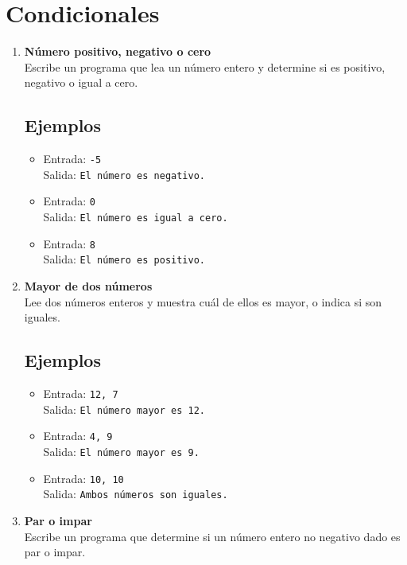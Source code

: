 \section{Condicionales}
\begin{enumerate}
    \item \textbf{Número positivo, negativo o cero}\\
    Escribe un programa que lea un número entero y determine si es positivo, negativo o igual a cero.
    \subsection*{Ejemplos}
    \begin{itemize}
        \item Entrada: \texttt{-5}\\
              Salida: \texttt{El número es negativo.}
        \item Entrada: \texttt{0}\\
              Salida: \texttt{El número es igual a cero.}
        \item Entrada: \texttt{8}\\
              Salida: \texttt{El número es positivo.}
    \end{itemize}

    \item \textbf{Mayor de dos números}\\
    Lee dos números enteros y muestra cuál de ellos es mayor, o indica si son iguales.
    \subsection*{Ejemplos}
    \begin{itemize}
        \item Entrada: \texttt{12, 7}\\
              Salida: \texttt{El número mayor es 12.}
        \item Entrada: \texttt{4, 9}\\
              Salida: \texttt{El número mayor es 9.}
        \item Entrada: \texttt{10, 10}\\
              Salida: \texttt{Ambos números son iguales.}
    \end{itemize}

    \item \textbf{Par o impar}\\
    Escribe un programa que determine si un número entero no negativo dado es par o impar.

\end{enumerate}

